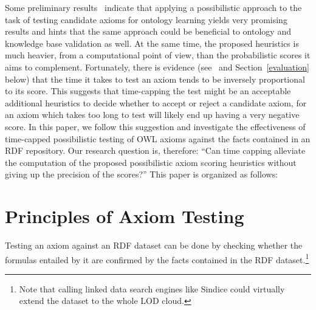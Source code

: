 \documentclass{sig-alternate}
\newcommand{\todo}[1]{\par\framebox{\parbox{3in}{#1}}\par}
\begin{document}
Some preliminary results~\cite{TettamanziFaronZuckerGandon2014ekaw} indicate that
applying a possibilistic approach to the task of testing candidate axioms
for ontology learning yields very promising results and hints that the same approach
could be beneficial to ontology and knowledge base validation as well.
At the same time, the proposed heuristics is much heavier, from a computational
point of view, than the probabilistic scores it aims to complement.
Fortunately, there is evidence (see~\cite{TettamanziFaronZuckerGandon2014ekaw} and
Section~\ref{evaluation} below) that the time it takes to test an axiom
tends to be inversely proportional to its score.
This suggests that time-capping the test might be an acceptable additional heuristics
to decide whether to accept or reject a candidate axiom, for an axiom which takes
too long to test will likely end up having a very negative score.
In this paper, we follow this suggestion and investigate the effectiveness
of time-capped possibilistic testing of OWL axioms against the facts contained
in an RDF repository.
Our research question is, therefore: ``Can time capping alleviate the computation
of the proposed possibilistic axiom scoring heuristics without giving up
the precision of the scores?''
This paper is organized as follows: \todo{Paper structure}

\section{Principles of Axiom Testing}\label{principles}

Testing an axiom against an RDF dataset can be done by checking whether the formulas entailed by it
are confirmed by the facts contained in the RDF dataset.\footnote{Note that calling linked data search engines
like Sindice could virtually extend the dataset to the whole LOD cloud.}
\end{document}
